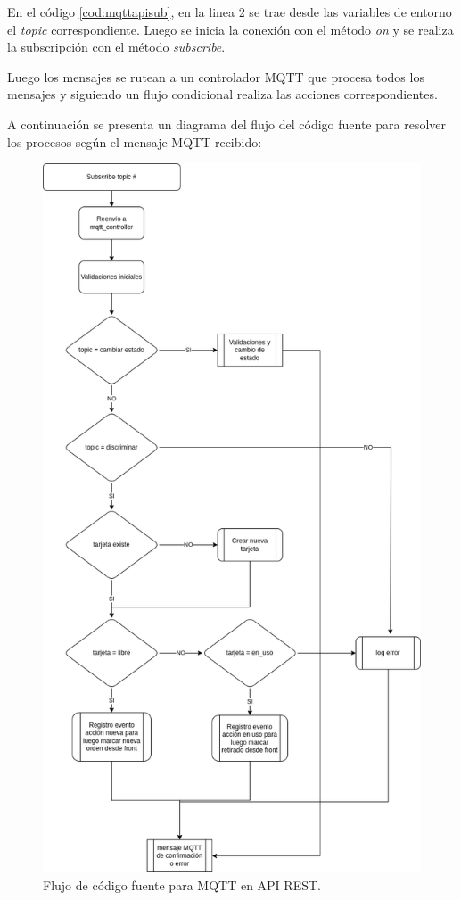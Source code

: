 En el código \ref{cod:mqttapisub}, en la linea 2 se trae desde las variables de entorno el \textit{topic} correspondiente. Luego se inicia la conexión con el método \textit{on} y se realiza la subscripción con el método \textit{subscribe}. 

Luego los mensajes se rutean a un controlador MQTT que procesa todos los mensajes y siguiendo un flujo condicional realiza las acciones correspondientes.

A continuación se presenta un diagrama del flujo del código fuente para resolver los procesos según el mensaje MQTT recibido:

\begin{figure}[ht]
	\centering
	\includegraphics[scale=.50]{./Figures/mqtt-controller-api.png}
	\caption{Flujo de código fuente para MQTT en API REST.}
	\label{fig:mqttcontrollerapi}
\end{figure}

